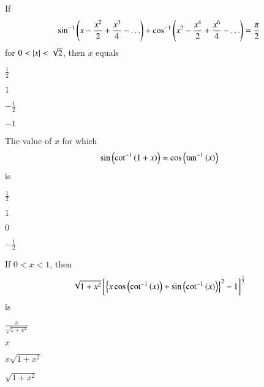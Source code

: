 \item If
\begin{align*}
\sin ^{-1}\left(x-\frac{x^2}{2}+\frac{x^3}{4}-\ldots\right)+ \cos ^{-1}\left(x^2-\frac{x^4}{2}+\frac{x^6}{4}-\ldots\right)=\frac{\pi}{2}
\end{align*}
for $0<\left\vert x\right\vert<\sqrt{2}$, then $x$ equals 
\hfill {}
\begin{enumerate}
\begin{multicols}{2}
\item $\frac{1}{2}$
\columnbreak
\item $1$ 
\end{multicols}
\begin{multicols}{2}
\item $-\frac{1}{2}$ 
\columnbreak
\item $-1$
\end{multicols}
\end{enumerate}
\item The value of $x$ for which 
\begin{align*}
\sin\left(\cot^{-1}\left(1+x\right)\right)=\cos \left(\tan ^{-1}\left(x\right)\right)
\end{align*}
is 
\hfill {}
\begin{enumerate}
\begin{multicols}{2}
\item $\frac{1}{2}$ 
\columnbreak
\item $1$
\end{multicols}
\begin{multicols}{2}
\item $0$ 
\columnbreak
\item $-\frac{1}{2}$
\end{multicols}
\end{enumerate}
\item  If $0<x<1$, then 
\begin{multline*}
\sqrt{1+x^2}{}\left[\left\{ x\cos \left(\cot ^{-1}\left(x\right)\right)+ \sin \left(\cot ^{-1}\left(x\right)\right)\right\}^2 - 1\right]^{\frac{1}{2}}
\end{multline*}
is
\hfill {}
\begin{enumerate}
\begin{multicols}{2}
\item $\frac{x}{\sqrt{1+x^2}}$ 
\columnbreak
\item $x$
\end{multicols}
\begin{multicols}{2}
\item $x\sqrt{1+x^2}$ 
\columnbreak
\item $\sqrt{1+x^2}$
\end{multicols}
\end{enumerate}
